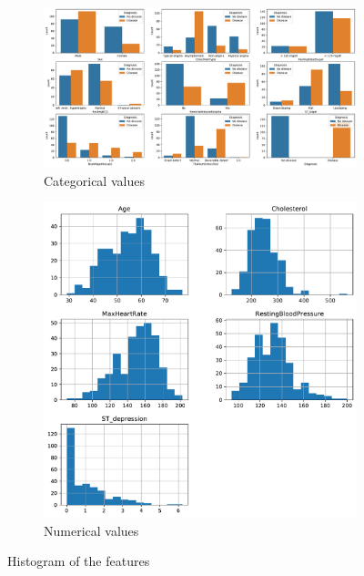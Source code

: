 \documentclass[conference]{IEEEtran}
\begin{document}
\begin{figure}[htpb]
    \centering
    \begin{subfigure}[b]{0.45\textwidth}
        \includegraphics[width=1\linewidth]{images/view_categorical.pdf}
        \caption{Categorical values}
        \label{hist_cat}
    \end{subfigure}      
    \begin{subfigure}[b]{0.45\textwidth}
        \includegraphics[width=1\linewidth]{images/view_numerical.pdf}
        \caption{Numerical values}
        \label{hist_num}
    \end{subfigure}
    \label{hist}
    \caption[Histograms]{Histogram of the features}
\end{figure}
\end{document}

